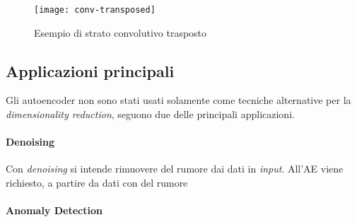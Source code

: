 \begin{figure}[ht]
  \begin{center}
    \texttt{[image: conv-transposed]}
    \caption{Esempio di strato convolutivo trasposto}
    \label{fig:conv-transposed}
  \end{center}
\end{figure}

\clearpage
\subsection{Applicazioni principali}
Gli autoencoder non sono stati usati solamente come tecniche alternative per la \textit{dimensionality reduction}, seguono due delle principali applicazioni.

\paragraph{Denoising}
Con \textit{denoising} si intende rimuovere del rumore dai dati in \textit{input}.
All'AE viene richiesto, a partire da dati con del rumore



\paragraph{Anomaly Detection}


